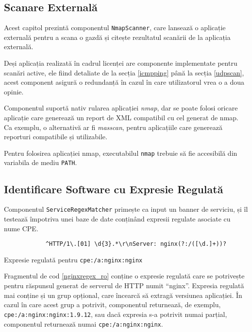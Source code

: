 \subsection*{Scanare Externală}

	Acest capitol prezintă componentul \texttt{NmapScanner}, care lansează o aplicație externală pentru a scana o gazdă și citește rezultatul scanării de la aplicația externală.
	
	Deși aplicația realizată în cadrul licenței are componente implementate pentru scanări active, ele fiind detaliate de la secția \ref{icmpping} până la secția \ref{udpscan}, acest component asigură o redundanță în cazul în care utilizatorul vrea o a doua opinie.
	
	Componentul suportă nativ rularea aplicației \textit{nmap}, dar se poate folosi oricare aplicație care generează un report de XML compatibil cu cel generat de nmap. Ca exemplu, o alternativă ar fi \textit{masscan}, pentru aplicațiile care generează reporturi compatibile și utilizabile.
	
	Pentru folosirea aplicației nmap, executabilul \texttt{nmap} trebuie să fie accesibilă din variabila de mediu \texttt{PATH}.

\subsection*{Identificare Software cu Expresie Regulată}

	Componentul \texttt{ServiceRegexMatcher} primește ca input un banner de serviciu, și îl testează împotriva unei baze de date conținând expresii regulate asociate cu nume CPE.
	
	\begin{listing}[H]
		\begin{verbatim}
			^HTTP/1\.[01] \d{3}.*\r\nServer: nginx(?:/([\d.]+))?
		\end{verbatim}
		\caption{Expresie regulată pentru \texttt{cpe:/a:nginx:nginx}}
		\label{nginxregex_ro}
	\end{listing}
	
	Fragmentul de cod \ref{nginxregex_ro} conține o expresie regulată care se potrivește pentru răspunsul generat de serverul de HTTP numit ``nginx''. Expresia regulată mai conține și un grup opțional, care încearcă să extragă versiunea aplicației. În cazul în care acest grup a potrivit, componentul returnează, de exemplu, \texttt{cpe:/a:nginx:nginx:1.9.12}, sau dacă expresia s-a potrivit numai parțial, componentul returnează numai \texttt{cpe:/a:nginx:nginx}.
	
